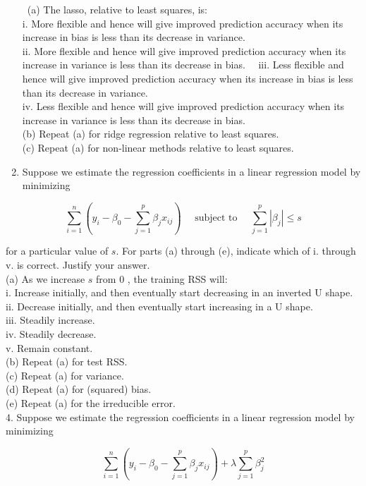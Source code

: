 \documentclass[10pt]{article}
\begin{document}
\begin{enumerate}
\
(a) The lasso, relative to least squares, is:\\
i. More flexible and hence will give improved prediction accuracy when its increase in bias is less than its decrease in variance.\\
ii. More flexible and hence will give improved prediction accuracy when its increase in variance is less than its decrease in bias.\
\
iii. Less flexible and hence will give improved prediction accuracy when its increase in bias is less than its decrease in variance.\\
iv. Less flexible and hence will give improved prediction accuracy when its increase in variance is less than its decrease in bias.\\
(b) Repeat (a) for ridge regression relative to least squares.\\
(c) Repeat (a) for non-linear methods relative to least squares.
  \item Suppose we estimate the regression coefficients in a linear regression model by minimizing
\end{enumerate}

$$
\sum_{i=1}^{n}\left(y_{i}-\beta_{0}-\sum_{j=1}^{p} \beta_{j} x_{i j}\right) \quad \text { subject to } \quad \sum_{j=1}^{p}\left|\beta_{j}\right| \leq s
$$

for a particular value of $s$. For parts (a) through (e), indicate which of i. through v. is correct. Justify your answer.\\
(a) As we increase $s$ from 0 , the training RSS will:\\
i. Increase initially, and then eventually start decreasing in an inverted U shape.\\
ii. Decrease initially, and then eventually start increasing in a U shape.\\
iii. Steadily increase.\\
iv. Steadily decrease.\\
v. Remain constant.\\
(b) Repeat (a) for test RSS.\\
(c) Repeat (a) for variance.\\
(d) Repeat (a) for (squared) bias.\\
(e) Repeat (a) for the irreducible error.\\
4. Suppose we estimate the regression coefficients in a linear regression model by minimizing

$$
\sum_{i=1}^{n}\left(y_{i}-\beta_{0}-\sum_{j=1}^{p} \beta_{j} x_{i j}\right)+\lambda \sum_{j=1}^{p} \beta_{j}^{2}
$$
\end{document}
